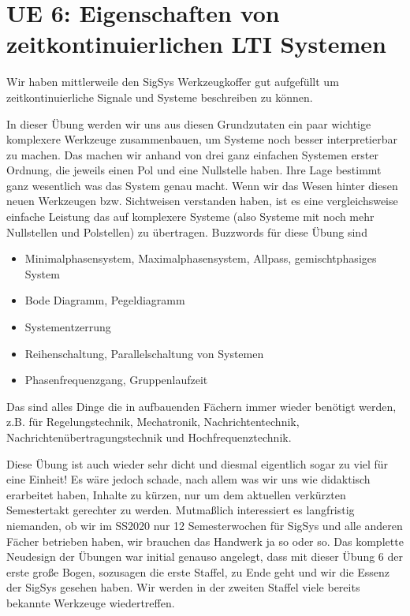 \clearpage
\section{UE 6: Eigenschaften von zeitkontinuierlichen LTI Systemen}

Wir haben mittlerweile den SigSys Werkzeugkoffer gut aufgefüllt um
zeitkontinuierliche Signale und Systeme beschreiben zu können.

In dieser Übung werden wir uns aus diesen Grundzutaten ein paar wichtige
komplexere Werkzeuge zusammenbauen, um Systeme noch besser interpretierbar zu
machen. Das machen wir anhand von drei ganz einfachen Systemen erster Ordnung,
die jeweils einen Pol und eine Nullstelle haben. Ihre Lage bestimmt ganz wesentlich
was das System genau macht. Wenn wir das Wesen hinter diesen neuen Werkzeugen
bzw. Sichtweisen verstanden haben, ist es eine vergleichsweise einfache
Leistung das auf komplexere Systeme (also Systeme mit noch mehr Nullstellen
und Polstellen) zu übertragen.
%
Buzzwords für diese Übung sind
\begin{itemize}
  \item Minimalphasensystem, Maximalphasensystem, Allpass, gemischtphasiges System
  \item Bode Diagramm, Pegeldiagramm
  \item Systementzerrung
  \item Reihenschaltung, Parallelschaltung von Systemen
  \item Phasenfrequenzgang, Gruppenlaufzeit
\end{itemize}
Das sind alles Dinge die in aufbauenden Fächern immer wieder benötigt
werden, z.B. für Regelungstechnik, Mechatronik, Nachrichtentechnik,
Nachrichtenübertragungstechnik und Hochfrequenztechnik.

Diese Übung ist auch wieder sehr dicht und diesmal eigentlich sogar zu viel für
eine Einheit!
Es wäre jedoch schade, nach allem was wir uns wie didaktisch erarbeitet haben,
Inhalte zu kürzen, nur um dem aktuellen verkürzten Semestertakt gerechter
zu werden. Mutmaßlich interessiert es langfristig niemanden, ob wir im SS2020
nur 12 Semesterwochen für SigSys und alle anderen Fächer betrieben haben,
wir brauchen das Handwerk ja so oder so. Das komplette Neudesign der Übungen
war initial genauso angelegt, dass mit dieser Übung 6 der erste große Bogen,
sozusagen die erste Staffel, zu Ende geht und wir die Essenz der SigSys
gesehen haben.
Wir werden in der zweiten Staffel viele bereits bekannte Werkzeuge wiedertreffen.

